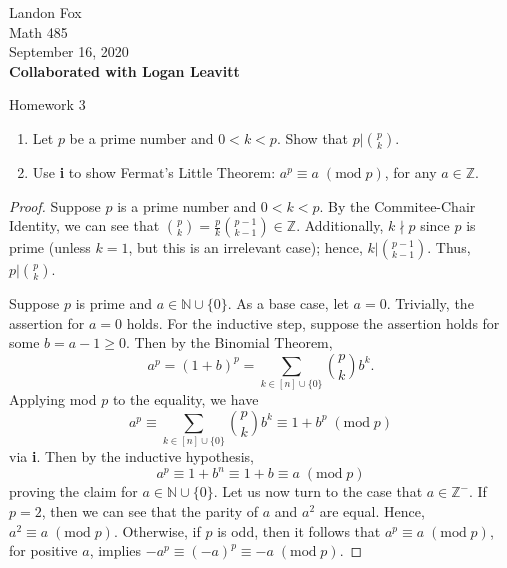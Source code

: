 \documentclass[ 12pt ]{article}
\begin{document}
\noindent Landon Fox \\
\noindent Math 485 \\
\noindent September 16, 2020 \\
\noindent \textbf{Collaborated with Logan Leavitt}

\begin{center}
\Large Homework 3
\end{center}

\begin{enumerate}
	\item[\textbf{1.}]
		\begin{enumerate}
			\item[\textbf{i.}] Let $p$ be a prime number and $0 < k < p$. Show that $p | \binom{p}{k}$.
			\item[\textbf{ii.}] Use \textbf{i} to show Fermat's Little Theorem: $a^p \equiv a\; (\mathrm{mod}\; p)$, for any $a \in \mathbb{Z}$.
		\end{enumerate}

		\begin{proof}
			\item[\textbf{i.}] Suppose $p$ is a prime number and $0 < k < p$. By the Commitee-Chair Identity, we can see that $\binom{p}{k} = \frac{p}{k}\binom{p-1}{k-1}
				\in \mathbb{Z}$. Additionally, $k \nmid p$ since $p$ is prime (unless $k=1$, but this is an irrelevant case); hence, $k | \binom{p-1}{k-1}$. Thus, $p | \binom{p}{k}$.

			\item[\textbf{ii.}] Suppose $p$ is prime and $a \in \mathbb{N} \cup \{ 0 \}$. As a base case, let $a=0$. Trivially, the assertion for $a=0$ holds. For the
				inductive step, suppose the assertion holds for some $b = a-1 \geq 0$. Then by the Binomial Theorem, $$a^p = (1+b)^p = \sum_{k \in [n] \cup \{ 0 \}}
				\binom{p}{k} b^k.$$ Applying mod $p$ to the equality, we have $$a^p \equiv \sum_{k \in [n] \cup \{ 0 \}} \binom{p}{k} b^k \equiv 1 + b^p\; ( \mathrm{mod}\; p )$$ via
				\textbf{i}. Then by the inductive hypothesis, $$a^p \equiv 1 + b^n \equiv 1 + b \equiv a \; ( \mathrm{mod}\; p )$$ proving the claim for $a \in \mathbb{N} \cup \{ 0 \}$.
				Let us now turn to the case that $a \in \mathbb{Z}^-$. If $p = 2$, then we can see that the parity of $a$ and $a^2$ are equal. Hence, $a^2 \equiv a\; (
				\mathrm{mod}\; p )$. Otherwise, if $p$ is odd, then it follows that $a^p \equiv a\; ( \mathrm{mod}\; p )$, for positive $a$, implies $-a^p \equiv (-a)^p \equiv
				-a\; ( \mathrm{mod}\; p )$.
		\end{proof}



\end{enumerate}
\end{document}
